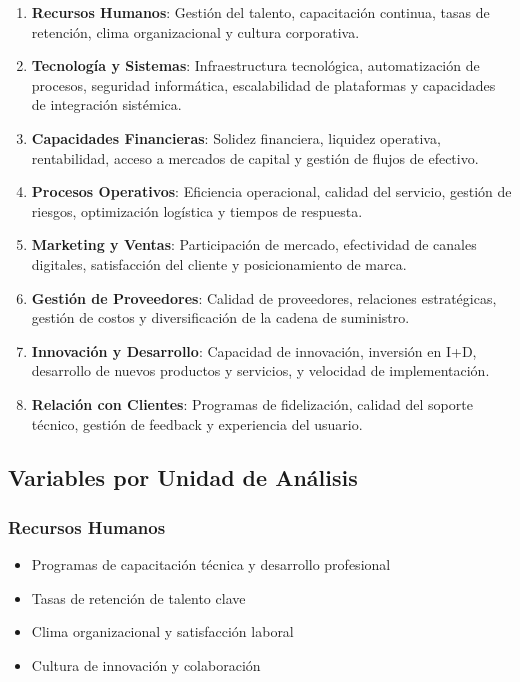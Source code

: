 \begin{enumerate}
\item \textbf{Recursos Humanos}: Gestión del talento, capacitación continua, tasas de retención, clima organizacional y cultura corporativa.

\item \textbf{Tecnología y Sistemas}: Infraestructura tecnológica, automatización de procesos, seguridad informática, escalabilidad de plataformas y capacidades de integración sistémica.

\item \textbf{Capacidades Financieras}: Solidez financiera, liquidez operativa, rentabilidad, acceso a mercados de capital y gestión de flujos de efectivo.

\item \textbf{Procesos Operativos}: Eficiencia operacional, calidad del servicio, gestión de riesgos, optimización logística y tiempos de respuesta.

\item \textbf{Marketing y Ventas}: Participación de mercado, efectividad de canales digitales, satisfacción del cliente y posicionamiento de marca.

\item \textbf{Gestión de Proveedores}: Calidad de proveedores, relaciones estratégicas, gestión de costos y diversificación de la cadena de suministro.

\item \textbf{Innovación y Desarrollo}: Capacidad de innovación, inversión en I+D, desarrollo de nuevos productos y servicios, y velocidad de implementación.

\item \textbf{Relación con Clientes}: Programas de fidelización, calidad del soporte técnico, gestión de feedback y experiencia del usuario.
\end{enumerate}

\subsection{Variables por Unidad de Análisis}

\subsubsection{Recursos Humanos}
\begin{itemize}
\item Programas de capacitación técnica y desarrollo profesional
\item Tasas de retención de talento clave
\item Clima organizacional y satisfacción laboral
\item Cultura de innovación y colaboración
\end{itemize}

